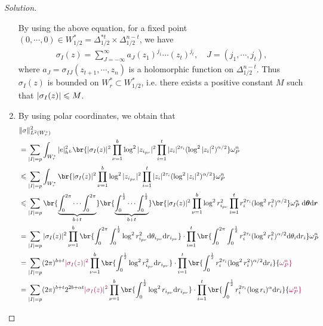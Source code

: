 \documentclass[twoside,openany,12pt]{beautynote}
\begin{document}
\begin{proof}[Solution]
\begin{enumerate}
        By using the above equation, for a fixed point $(0,\cdots,0)\in W_{1/2}^*=\Delta_{1/2}^{*t}\times \Delta_{1/2}^{n-t}$, we have 
        \begin{align*}
            \sigma_I(z)=\sum_{J=-\infty}^{\infty} a_J (z_1)^{j_1} \cdots (z_t)^{j_t}, \quad J=(j_1,\cdots,j_t),
        \end{align*}
            where $a_J=\sigma_{IJ}(z_{t+1},\cdots,z_n)$ is a holomorphic function on $\Delta_{1/2}^{n-t}$. Thus $\sigma_I(z)$ is bounded on $W_r^*\subset W_{1/2}^*$, i.e. there exists a positive constant $M$ such that $\abs{\sigma_I(z)}\leqslant M$.
        \item By using polar coordinates, we obtain that
        \begin{align*}
            &\|\sigma\|^2_{L^2(W_r^*)} \\
            &=\sum_{|I|=p}\int_{W_r^*} |e|^2_{h^L} \br{ |\sigma_I(z)|^2 \prod_{\nu=1}^b \log^2 |z_{i_{p\nu}}|^2 \prod_{i=1}^t |z_i|^{2\tau_i}(\log^2 |z_i|^2)^{\alpha/2} } \omega_P^n \\
            &\leqslant \sum_{|I|=p}\int_{W_r^*}  \br{ |\sigma_I(z)|^2 \prod_{\nu=1}^b \log^2 |z_{i_{p\nu}}|^2 \prod_{i=1}^t |z_i|^{2\tau_i}(\log^2 |z_i|^2)^{\alpha/2} } \omega_P^n \\
            &\leqslant\sum_{|I|=p} \br{\underbrace{\int_0^{2\pi}\cdots \int_0^{2\pi}}_{b+t}}\br{\underbrace{\int_{0}^{\frac 12}\cdots \int_{0}^{\frac 12}}_{b+t}}  \br{ |\sigma_I(z)|^2 \prod_{\nu=1}^b \log^2 r_{i_{p\nu}}^2 \prod_{i=1}^t r_i^{2\tau_i}(\log^2 r_i^2)^{\alpha/2} } \omega_P^n \;\dd \bm{\theta}\dd \bm{r} \\ 
            &=\sum_{|I|=p}|\sigma_I(z)|^2 \prod_{\nu=1}^b\br{ \int_0^{2\pi}\int_{0}^{\frac 12} \log^2 r_{i_{p\nu}}^2 \dd \theta_{i_{p\nu}}\dd r_{i_{p\nu}} }\cdot \prod_{i=1}^t\br{ \int_0^{2\pi}\int_{0}^{\frac 12} r_i^{2\tau_i}(\log^2 r_i^2)^{\alpha/2} \dd \theta_i\dd r_{i} } \omega_P^n \\
            &=\sum_{|I|=p}(2\pi)^{b+t}{\color{purple}|\sigma_I(z)|^2} \prod_{\nu=1}^b\br{ \int_{0}^{\frac 12} \log^2 r_{i_{p\nu}}^2 \dd r_{i_{p\nu}} }\cdot \prod_{i=1}^t\br{ \int_{0}^{\frac 12} r_i^{2\tau_i}(\log^2 r_i^2)^{\alpha/2} \dd r_i } {\color{purple}\omega_P^n}\\ 
            &=\sum_{|I|=p}(2\pi)^{b+t} 2^{2b+\alpha t}{\color{purple}|\sigma_I(z)|^2} \prod_{\nu=1}^b\br{ \int_{0}^{\frac 12} \log^2 r_{i_{p\nu}} \dd r_{i_{p\nu}} }\cdot \prod_{i=1}^t\br{ \int_{0}^{\frac 12} r_i^{2\tau_i}(\log r_i)^{\alpha} \dd r_i } {\color{purple}\omega_P^n}\\ 

\end{align*}
\end{enumerate}
\end{proof}
\end{document}
